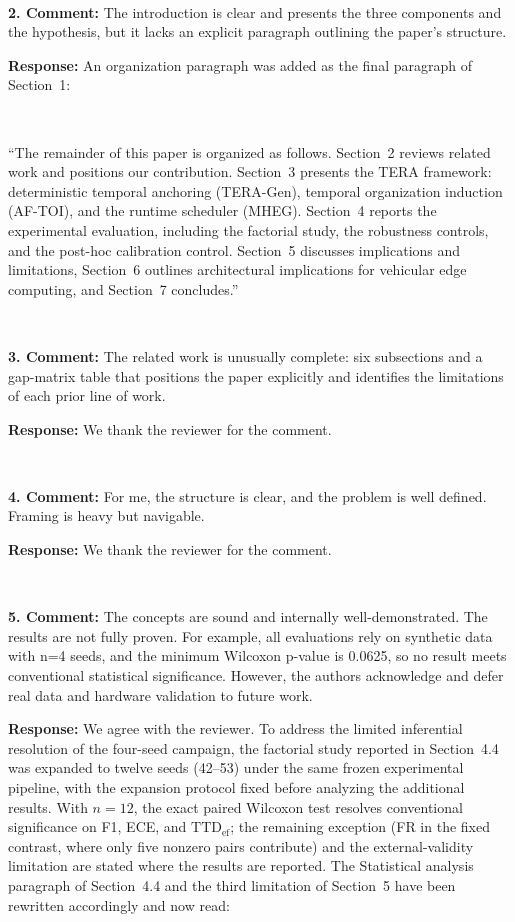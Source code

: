 \documentclass[1p,12pt,authoryear]{elsarticle}
\begin{document}
~

\noindent \textbf{2. Comment:} The introduction is clear and presents the three components and the hypothesis, but it lacks an explicit paragraph outlining the paper's structure.

\vspace{2mm}
\noindent \textbf{Response:} An organization paragraph was added as the final paragraph of Section~1:

~

``The remainder of this paper is organized as follows. Section~2 reviews related work and positions our contribution. Section~3 presents the TERA framework: deterministic temporal anchoring (TERA-Gen), temporal organization induction (AF-TOI), and the runtime scheduler (MHEG). Section~4 reports the experimental evaluation, including the factorial study, the robustness controls, and the post-hoc calibration control. Section~5 discusses implications and limitations, Section~6 outlines architectural implications for vehicular edge computing, and Section~7 concludes.''

~

\noindent \textbf{3. Comment:} The related work is unusually complete: six subsections and a gap-matrix table that positions the paper explicitly and identifies the limitations of each prior line of work.

\vspace{2mm}
\noindent \textbf{Response:} We thank the reviewer for the comment.

~

\noindent \textbf{4. Comment:} For me, the structure is clear, and the problem is well defined. Framing is heavy but navigable.

\vspace{2mm}
\noindent \textbf{Response:} We thank the reviewer for the comment.

~

\noindent \textbf{5. Comment:} The concepts are sound and internally well-demonstrated. The results are not fully proven. For example, all evaluations rely on synthetic data with n=4 seeds, and the minimum Wilcoxon p-value is 0.0625, so no result meets conventional statistical significance. However, the authors acknowledge and defer real data and hardware validation to future work.

\vspace{2mm}
\noindent \textbf{Response:} We agree with the reviewer. To address the limited inferential resolution of the four-seed campaign, the factorial study reported in Section~4.4 was expanded to twelve seeds (42--53) under the same frozen experimental pipeline, with the expansion protocol fixed before analyzing the additional results. With $n=12$, the exact paired Wilcoxon test resolves conventional significance on F1, ECE, and $\mathrm{TTD}_{\mathrm{ef}}$; the remaining exception (FR in the fixed contrast, where only five nonzero pairs contribute) and the external-validity limitation are stated where the results are reported. The Statistical analysis paragraph of Section~4.4 and the third limitation of Section~5 have been rewritten accordingly and now read:
\end{document}
